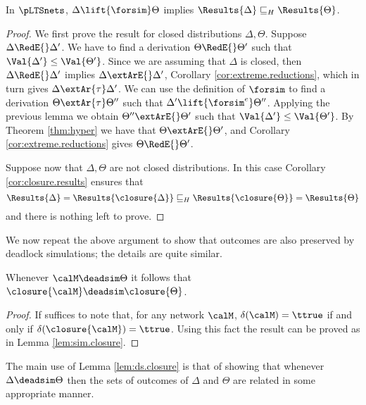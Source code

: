 \documentclass{LMCS}
\begin{document}
\begin{cor}\label{cor:results}
   In $\pLTSnets$, $\Delta \lift{\forsim} \Theta$ implies
  $\Results{\Delta} \sqsubseteq_{H} \Results{\Theta}$.
\end{cor}
\begin{proof}
	We first prove the result for closed distributions $\Delta, \Theta$.
  Suppose $\Delta \RedE{} \Delta'$. We have to find  a derivation $\Theta \RedE{} \Theta'$ such
  that $\Val{\Delta'} \leq \Val{\Theta'}$. 
  Since we are assuming that $\Delta$ is closed, then $\Delta \RedE{} \Delta'$ implies 
  $\Delta \extArE{} \Delta'$, Corollary \ref{cor:extreme.reductions}, 
  which in turn gives $\Delta \extAr{\tau} \Delta'$.
  We can use the definition of $\forsim$ to find a 
        derivation $\Theta \extAr{\tau} \Theta''$ such that $\Delta' \lift{\forsim^e} \Theta''$. 
        Applying the previous lemma we obtain $\Theta'' \extArE{} \Theta'$ such that 
        $\Val{\Delta'} \leq \Val{\Theta'}$. By Theorem \ref{thm:hyper} we have that 
        $\Theta \extArE{} \Theta'$, and Corollary \ref{cor:extreme.reductions} 
        gives $\Theta \RedE{} \Theta'$. 

	Suppose now that $\Delta, \Theta$ are not closed distributions. 
	In this case Corollary \ref{cor:closure.results} ensures that 
	\[
	\Results{\Delta} = \Results{\closure{\Delta}} \sqsubseteq_{H} 
	\Results{\closure{\Theta}} = \Results{\Theta}
	\]
	\noindent and there is nothing left to prove. 
\end{proof}


\bigskip

We now repeat the above argument to show that outcomes are also preserved by
deadlock simulations; the details are quite similar. 
\begin{lem}
\label{lem:ds.closure}
Whenever $\calM \deadsim \Theta$ it follows that 
$\closure{\calM} \deadsim \closure{\Theta}$.
\end{lem}

\begin{proof}
If suffices to note that, for any network 
$\calM$, $\delta(\calM) = \ttrue$ 
if and only if $\delta(\closure{\calM}) = \ttrue$. 
Using this fact the result can be proved as in Lemma 
\ref{lem:sim.closure}.
\end{proof}

The main use of Lemma \ref{lem:ds.closure} is that of 
showing that whenever $\Delta \deadsim \Theta$ then 
the sets of outcomes of $\Delta$ and $\Theta$ are 
related in some appropriate manner. 
\end{document}

